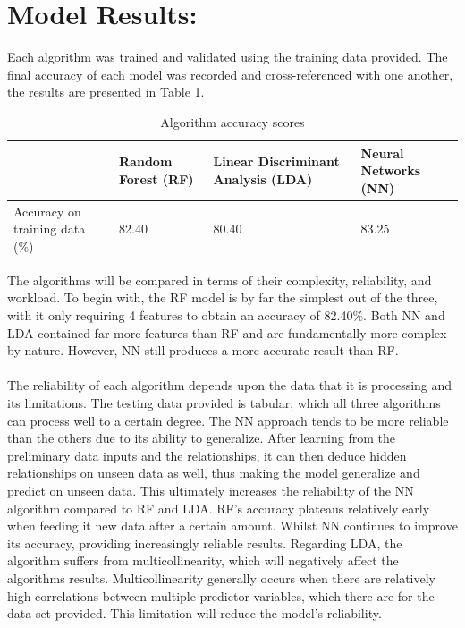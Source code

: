 \documentclass{article}
\begin{document}
\section{Model Results:}
Each algorithm was trained and validated using the training data provided. The final accuracy of each model was recorded and cross-referenced with one another, the results are presented in Table 1.
\begin{table}[h]
\centering
\begin{tabular}{ |p{3cm}|p{3cm}|p{3cm}|p{3cm}|  }
 \hline
 &Random Forest (RF)&Linear Discriminant Analysis (LDA)&Neural Networks (NN)\\
 \hline
 Accuracy on training data (\%) & 82.40 & 80.40 & 83.25\\
 \hline
\end{tabular}
\caption{Algorithm accuracy scores}
\end{table}
The algorithms will be compared in terms of their complexity, reliability, and workload. To begin with, the RF model is by far the simplest out of the three, with it only requiring 4 features to obtain an accuracy of 82.40\%. Both NN and LDA contained far more features than RF and are fundamentally more complex by nature. However, NN still produces a more accurate result than RF. \\ \\

The reliability of each algorithm depends upon the data that it is processing and its limitations. The testing data provided is tabular, which all three algorithms can process well to a certain degree. The NN approach tends to be more reliable than the others due to its ability to generalize. After learning from the preliminary data inputs and the relationships, it can then deduce hidden relationships on unseen data as well, thus making the model generalize and predict on unseen data. This ultimately increases the reliability of the NN algorithm compared to RF and LDA. RF’s accuracy plateaus relatively early when feeding it new data after a certain amount. Whilst NN continues to improve its accuracy, providing increasingly reliable results. Regarding LDA, the algorithm suffers from multicollinearity, which will negatively affect the algorithms results. Multicollinearity generally occurs when there are relatively high correlations between multiple predictor variables, which there are for the data set provided. This limitation will reduce the model’s reliability.\\ \\
\end{document}
